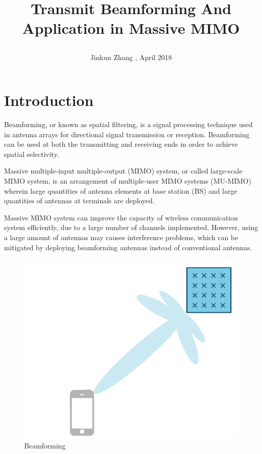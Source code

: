 \documentclass{article}
\title{\begin{center}
\Large
\textbf{
    Transmit Beamforming \linebreak And Application in Massive MIMO
    }
\end{center}}
\author{Jinkun Zhang , April 2018}
\date{}
\begin{document}
\twocolumn
\maketitle
\section{Introduction}

Beamforming, or known as spatial filtering, is a signal processing technique used in antenna arrays for directional signal transmission or reception. Beamforming can be used at both the transmitting and receiving ends in order to achieve spatial selectivity.\cite{BeamformingBook}

Massive multiple-input multiple-output (MIMO) system, or called large-scale MIMO system, is an arrangement of multiple-user MIMO systems (MU-MIMO) wherein large quantities of antenna elements at base station (BS) and large quantities of antennas at terminals are deployed.\cite{MassiveMIMO}

Massive MIMO system can improve the capacity of wireless communication system efficiently, due to a large number of channels implemented. However, using a large amount of antennas may causes interference problems, which can be mitigated by deploying beamforming antennas instead of conventional antennas.

\begin{figure}[b!]
\centering
\includegraphics[scale=0.2]{beamforming2.png}
\caption{Beamforming}
\label{fig:beamforming}
\end{figure}
\end{document}
